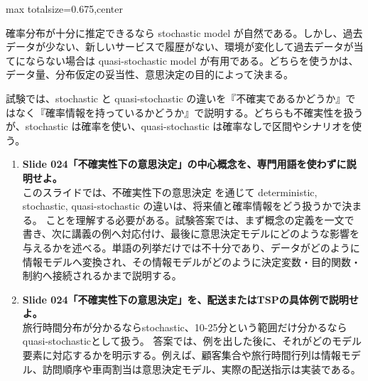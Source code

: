 \begin{adjustbox}{max totalsize={\textwidth}{0.675\textheight},center}
\begin{minipage}{\textwidth}
\begin{minipage}[t]{0.485\textwidth}
確率分布が十分に推定できるなら stochastic model が自然である。しかし、過去データが少ない、新しいサービスで履歴がない、環境が変化して過去データが当てにならない場合は quasi-stochastic model が有用である。どちらを使うかは、データ量、分布仮定の妥当性、意思決定の目的によって決まる。\par
試験では、stochastic と quasi-stochastic の違いを『不確実であるかどうか』ではなく『確率情報を持っているかどうか』で説明する。どちらも不確実性を扱うが、stochastic は確率を使い、quasi-stochastic は確率なしで区間やシナリオを使う。\par
{}
\begin{enumerate}
\item \textbf{Slide 024「不確実性下の意思決定」の中心概念を、専門用語を使わずに説明せよ。}\\このスライドでは、不確実性下の意思決定 を通じて deterministic, stochastic, quasi-stochastic の違いは、将来値と確率情報をどう扱うかで決まる。 ことを理解する必要がある。試験答案では、まず概念の定義を一文で書き、次に講義の例へ対応付け、最後に意思決定モデルにどのような影響を与えるかを述べる。単語の列挙だけでは不十分であり、データがどのように情報モデルへ変換され、その情報モデルがどのように決定変数・目的関数・制約へ接続されるかまで説明する。
\item \textbf{Slide 024「不確実性下の意思決定」を、配送またはTSPの具体例で説明せよ。}\\旅行時間分布が分かるならstochastic、10-25分という範囲だけ分かるならquasi-stochasticとして扱う。 答案では、例を出した後に、それがどのモデル要素に対応するかを明示する。例えば、顧客集合や旅行時間行列は情報モデル、訪問順序や車両割当は意思決定モデル、実際の配送指示は実装である。
\end{enumerate}
\end{minipage}
\end{minipage}
\end{adjustbox}

